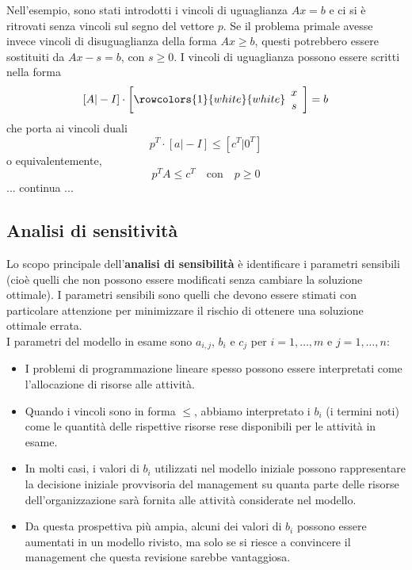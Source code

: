 \documentclass[a4paper]{extarticle}
\begin{document}
\vspace{1em}
\noindent
Nell'esempio, sono stati introdotti i vincoli di uguaglianza $Ax = b$ e ci si è ritrovati senza vincoli sul segno del vettore $p$. Se il problema primale avesse invece vincoli di disuguaglianza della forma $Ax \geq b$, questi potrebbero essere sostituiti da $Ax - s = b$, con $s \geq 0$. I vincoli di uguaglianza possono essere scritti nella forma
\[
   [A \vert-I] \cdot \left[
        \rowcolors{1}{white}{white}
        \begin{array}{c}
            x\\
            s
        \end{array}
    \right]=b
\]
che porta ai vincoli duali
\[p^T \cdot [a \vert -I] \leq [c^T \vert 0^T]\]
o equivalentemente,
\[p^T A \leq c^T \hspace{1em} \text{con} \hspace{1em} p \geq 0\]
... continua ...

\vspace{1em}
\subsection{Analisi di sensitività}
Lo scopo principale dell'\textbf{analisi di sensibilità} è identificare i parametri sensibili (cioè quelli che non possono essere modificati senza cambiare la soluzione ottimale). I parametri sensibili sono quelli che devono essere stimati con particolare attenzione per minimizzare il rischio di ottenere una soluzione ottimale errata.\\
I parametri del modello in esame sono $a_{i,j}$, $b_i$ e $c_j$ per $i = 1,\dots,m$ e $j = 1,\dots,n$:
\begin{itemize}
    \item I problemi di programmazione lineare spesso possono essere interpretati come l'allocazione di risorse alle attività.
    \item Quando i vincoli sono in forma $\leq$, abbiamo interpretato i $b_i$ (i termini noti) come le quantità delle rispettive risorse rese disponibili per le attività in esame.
    \item In molti casi, i valori di $b_i$ utilizzati nel modello iniziale possono rappresentare la decisione iniziale provvisoria del management su quanta parte delle risorse dell'organizzazione sarà fornita alle attività considerate nel modello.
    \item Da questa prospettiva più ampia, alcuni dei valori di $b_i$ possono essere aumentati in un modello rivisto, ma solo se si riesce a convincere il management che questa revisione sarebbe vantaggiosa.
\end{itemize}
\end{document}
